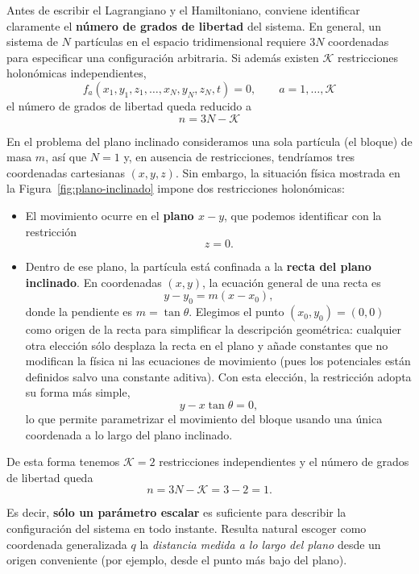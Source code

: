 \documentclass{article}
\begin{document}
Antes de escribir el Lagrangiano y el Hamiltoniano, conviene identificar claramente
el \textbf{número de grados de libertad} del sistema.  
En general, un sistema de \(N\) partículas en el espacio tridimensional requiere
\(3N\) coordenadas para especificar una configuración arbitraria. Si además
existen \(\mathcal{K}\) restricciones holonómicas independientes,
\[
f_{a}(x_{1},y_{1},z_{1},\dots,x_{N},y_{N},z_{N},t)=0,
\qquad a=1,\dots,\mathcal{K}
\]
el número de grados de libertad queda reducido a
\[
n = 3N - \mathcal{K}
\]

En el problema del plano inclinado consideramos una sola partícula (el bloque)
de masa \(m\), así que \(N=1\) y, en ausencia de restricciones, tendríamos tres
coordenadas cartesianas \((x,y,z)\).  
Sin embargo, la situación física mostrada en la
Figura~\ref{fig:plano-inclinado} impone dos restricciones holonómicas:

\begin{itemize}
  \item[$\bullet$] El movimiento ocurre en el \textbf{plano \(x\!-\!y\)}, que podemos
  identificar con la restricción
  \[
    z = 0.
  \]

  \item[$\bullet$] Dentro de ese plano, la partícula está confinada a la
  \textbf{recta del plano inclinado}.  
  En coordenadas \((x,y)\), la ecuación general de una recta es
  \[
     y - y_{0} = m(x - x_{0}),
  \]
  donde la pendiente es \(m = \tan\theta\).  
  Elegimos el punto \((x_{0},y_{0})=(0,0)\) como origen de la recta para simplificar
  la descripción geométrica: cualquier otra elección sólo desplaza la recta en el
  plano y añade constantes que no modifican la física ni las ecuaciones de movimiento
  (pues los potenciales están definidos salvo una constante aditiva).  
  Con esta elección, la restricción adopta su forma más simple,
  \[
    y - x\tan\theta = 0,
  \]
  lo que permite parametrizar el movimiento del bloque usando una única coordenada
  a lo largo del plano inclinado.
\end{itemize}

De esta forma tenemos \(\mathcal{K}=2\) restricciones independientes y el número
de grados de libertad queda
\[
n = 3N - \mathcal{K} = 3 - 2 = 1.
\]


Es decir, \textbf{sólo un parámetro escalar} es suficiente para describir la
configuración del sistema en todo instante.  
Resulta natural escoger como coordenada generalizada \(q\) la \emph{distancia
medida a lo largo del plano} desde un origen conveniente (por ejemplo, desde el
punto más bajo del plano).  
\end{document}
